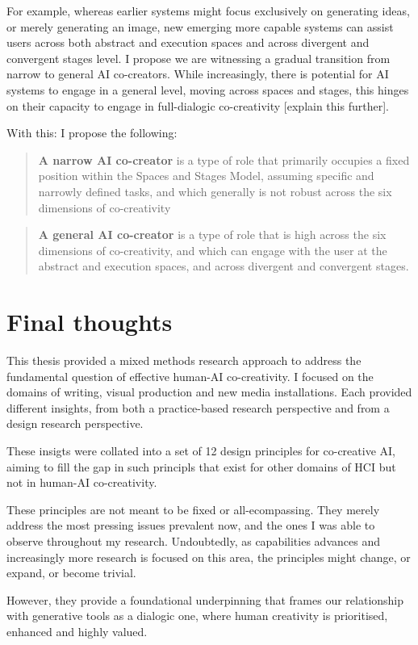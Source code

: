 For example, whereas earlier systems might focus exclusively on generating ideas, or merely generating an image, new emerging more capable systems can assist users across both abstract and execution spaces and across divergent and convergent stages level. I propose we are witnessing a gradual transition from narrow to general AI co-creators.
While increasingly, there is potential for AI systems to engage in a general level, moving across spaces and stages, this hinges on their capacity to engage in full-dialogic co-creativity [explain this further].

With this: I propose the following: 

\begin{quote}
    \textbf{A narrow AI co-creator} is a type of role that primarily occupies a fixed position within the Spaces and Stages Model, assuming specific and narrowly defined tasks, and which generally is not robust across the six dimensions of co-creativity
\end{quote}

\begin{quote}
    \textbf{A general AI co-creator} is a type of role that is high across the six dimensions of co-creativity, and which can engage with the user at the abstract and execution spaces, and across divergent and convergent stages. 
\end{quote}


\section{Final thoughts}

This thesis provided a mixed methods research approach to address the fundamental question of effective human-AI co-creativity. I focused on the domains of writing, visual production and new media installations. Each provided different insights, from both a practice-based research perspective and from a design research perspective. 

These insigts were collated into a set of 12 design principles for co-creative AI, aiming to fill the gap in such principls that exist for other domains of HCI but not in human-AI co-creativity. 

These principles are not meant to be fixed or all-ecompassing. They merely address the most pressing issues prevalent now, and the ones I was able to observe throughout my research. Undoubtedly, as capabilities advances and increasingly more research is focused on this area, the principles might change, or expand, or become trivial. 

However, they provide a foundational underpinning that frames our relationship with generative tools as a dialogic one, where human creativity is prioritised, enhanced and highly valued. 



